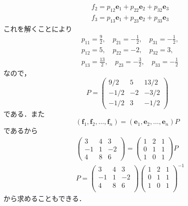 \documentclass[a4paper,10pt,fleqn]{ltjsarticle}
\begin{document}
\begin{leftbar}
\begin{align*}
         & f_2=p_{12}\bm{e}_1+p_{22}\bm{e}_2+p_{32}\bm{e}_3 \\
         & f_3=p_{13}\bm{e}_1+p_{23}\bm{e}_2+p_{33}\bm{e}_3
    \end{align*}
    これを解くことにより
    \begin{align*}
         & p_{11}=\frac{9}{2},\quad p_{21}=-\frac{1}{2},\quad p_{31}=-\frac{1}{2}, \\
         & p_{12}=5,\quad p_{22}=-2,\quad p_{32}=3,                                \\
         & p_{13}=\frac{13}{2},\quad p_{23}=-\frac{3}{2},\quad p_{33}=-\frac{1}{2}
    \end{align*}
    なので，
    \[
        P=
        \begin{pmatrix}
            9/2  & 5  & 13/2 \\
            -1/2 & -2 & -3/2 \\
            -1/2 & 3  & -1/2
        \end{pmatrix}
    \]
    である．また
    \begin{equation*}
        (\bm{f}_1,\bm{f}_2,\ldots ,\bm{f}_n)=(\bm{e}_1,\bm{e}_2,\ldots ,\bm{e}_n)P
    \end{equation*}
    であるから
    \begin{align*}
         &
        \begin{pmatrix}
            3  & 4 & 3  \\
            -1 & 1 & -2 \\
            4  & 8 & 6
        \end{pmatrix}
        =
        \begin{pmatrix}
            1 & 2 & 1 \\
            0 & 1 & 1 \\
            1 & 0 & 1
        \end{pmatrix}
        P     \\
         & P=
        \begin{pmatrix}
            3  & 4 & 3  \\
            -1 & 1 & -2 \\
            4  & 8 & 6  \\
        \end{pmatrix}
        \begin{pmatrix}
            1 & 2 & 1 \\
            0 & 1 & 1 \\
            1 & 0 & 1 \\
        \end{pmatrix}
        ^{-1}
    \end{align*}
    から求めることもできる．
\end{leftbar}
\end{document}
